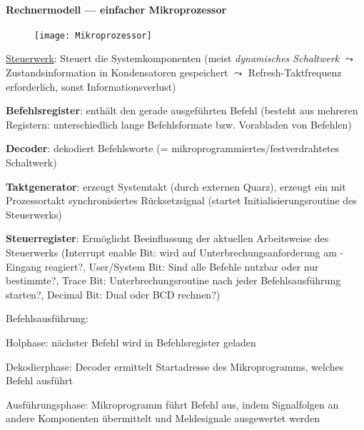\newpage

\paragraph{Rechnermodell --- einfacher Mikroprozessor}
\begin{figure}[H]
  \centering
  \texttt{[image: Mikroprozessor]}
  \label{Mikroprozessor}
\end{figure}
\begin{items}
	\item \underline{\textcolor{red!90!black}{Steuerwerk}}: Steuert die Systemkomponenten (meist \emph{dynamisches Schaltwerk} $\leadsto$ Zustandsinformation in Kondensatoren gespeichert $\leadsto$ Refresh-Taktfrequenz erforderlich, sonst Informationsverlust)
	\begin{enumeration}
		\item \textbf{Befehlsregister}: enthält den gerade ausgeführten Befehl (besteht aus mehreren Registern: unterschiedlich lange Befehlsformate bzw. Vorabladen von Befehlen)
		\item \textbf{Decoder}: dekodiert Befehlsworte (= mikroprogrammiertes/festverdrahtetes Schaltwerk)
		\item \textbf{Taktgenerator}: erzeugt Systemtakt (durch externen Quarz), erzeugt ein mit Prozessortakt synchronisiertes Rücksetzsignal (startet Initialisierungsroutine des Steuerwerks)
		\item \textbf{Steuerregister}: Ermöglicht Beeinflussung der aktuellen Arbeitsweise des Steuerwerks (Interrupt enable Bit: wird auf Unterbrechungsanforderung am -Eingang reagiert?, User/System Bit: Sind alle Befehle nutzbar oder nur bestimmte?, Trace Bit: Unterbrechungsroutine nach jeder Befehlsausführung starten?, Decimal Bit: Dual oder BCD rechnen?)
	\end{enumeration}
	\item Befehlsausführung:
	\begin{enumeration}
		\item Holphase: nächster Befehl wird in Befehlsregister geladen
		\item Dekodierphase: Decoder ermittelt Startadresse des Mikroprogramms, welches Befehl ausführt
		\item Ausführungsphase: Mikroprogramm führt Befehl aus, indem Signalfolgen an andere Komponenten übermittelt und Meldesignale ausgewertet werden
	\end{enumeration}


\end{items}
